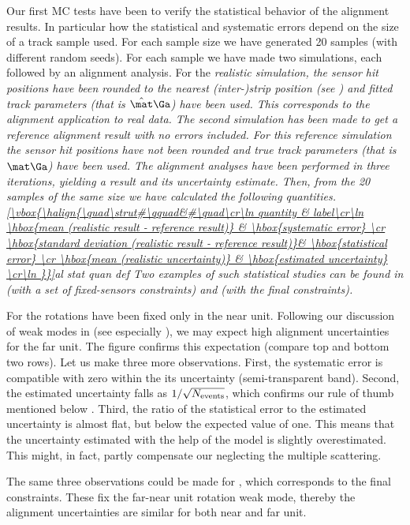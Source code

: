 Our first MC tests have been to verify the statistical behavior of the alignment results. In particular how the statistical and systematic errors depend on the size of a track sample used. For each sample size we have generated 20 samples (with different random seeds). For each sample we have made two simulations, each followed by an alignment analysis. For the \em{realistic simulation}, the sensor hit positions have been rounded to the nearest (inter-)strip position (see ) and fitted track parameters (that is $\hat\mat\Ga$) have been used. This corresponds to the alignment application to real data. The second simulation has been made to get a reference alignment result with no errors included. For this \em{reference simulation} the sensor hit positions have not been rounded and true track parameters (that is $\mat\Ga$) have been used. The alignment analyses have been performed in three iterations, yielding a result and its uncertainty estimate. Then, from the 20 samples of the same size we have calculated the following quantities.
\eqref{\vbox{\halign{\quad\strut#\qquad&#\quad\cr\ln
quantity & label\cr\ln
\hbox{mean (realistic result - reference result)}	& \hbox{systematic error} \cr
\hbox{standard deviation (realistic result - reference result)}& \hbox{statistical error} \cr
\hbox{mean (realistic uncertainty)} 					& \hbox{estimated uncertainty} \cr\ln
}}}{al stat quan def}
Two examples of such statistical studies can be found in  (with a set of fixed-sensors constraints) and  (with the final constraints).

For  the rotations have been fixed only in the near unit. Following our discussion of weak modes in  (see especially ), we may expect high alignment uncertainties for the far unit. The figure confirms this expectation (compare top and bottom two rows). Let us make three more observations. First, the systematic error is compatible with zero within the its uncertainty (semi-transparent band). Second, the estimated uncertainty falls as $1/\sqrt{N_{\rm events}}$, which confirms our rule of thumb mentioned below . Third, the ratio of the statistical error to the estimated uncertainty is almost flat, but below the expected value of one. This means that the uncertainty estimated with the help of the model  is slightly overestimated. This might, in fact, partly compensate our neglecting the multiple scattering.

The same three observations could be made for , which corresponds to the final constraints. These fix the far-near unit rotation weak mode, thereby the alignment uncertainties are similar for both near and far unit.

